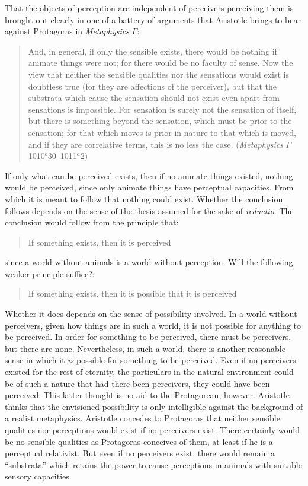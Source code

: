
That the objects of perception are independent of perceivers perceiving them is brought out clearly in one of a battery of arguments that Aristotle brings to bear against Protagoras in \emph{Metaphysics} \( \Gamma \):
\begin{quote}
	And, in general, if only the sensible exists, there would be nothing if animate things were not; for there would be no faculty of sense. Now the view that neither the sensible qualities nor the sensations would exist is doubtless true (for they are affections of the perceiver), but that the substrata which cause the sensation should not exist even apart from sensations is impossible. For sensation is surely not the sensation of itself, but there is something beyond the sensation, which must be prior to the sensation; for that which moves is prior in nature to that which is moved, and if they are correlative terms, this is no less the case. (\emph{Metaphysics} \( \Gamma \) 1010\( ^{b} \)30--1011\( ^{a} \)2)
\end{quote}

If only what can be perceived exists, then if no animate things existed, nothing would be perceived, since only animate things have perceptual capacities. From which it is meant to follow that nothing could exist. Whether the conclusion follows depends on the sense of the thesis assumed for the sake of \emph{reductio}. The conclusion would follow from the principle that:
\begin{quote}
	If something exists, then it is perceived
\end{quote}
since a world without animals is a world without perception. Will the following weaker principle suffice?:
\begin{quote}
	If something exists, then it is possible that it is perceived 
\end{quote}
Whether it does depends on the sense of possibility involved. In a world without perceivers, given how things are in such a world, it is not possible for anything to be perceived. In order for something to be perceived, there must be perceivers, but there are none. Nevertheless, in such a world, there is another reasonable sense in which it \emph{is} possible for something to be perceived. Even if no perceivers existed for the rest of eternity, the particulars in the natural environment could be of such a nature that had there been perceivers, they could have been perceived. This latter thought is no aid to the Protagorean, however. Aristotle thinks that the envisioned possibility is only intelligible against the background of a realist metaphysics. Aristotle concedes to Protagoras that neither sensible qualities nor perceptions would exist if no perceivers exist. There certainly would be no sensible qualities as Protagoras conceives of them, at least if he is a perceptual relativist. But even if no perceivers exist, there would remain a ``substrata'' which retains the power to cause perceptions in animals with suitable sensory capacities. 

